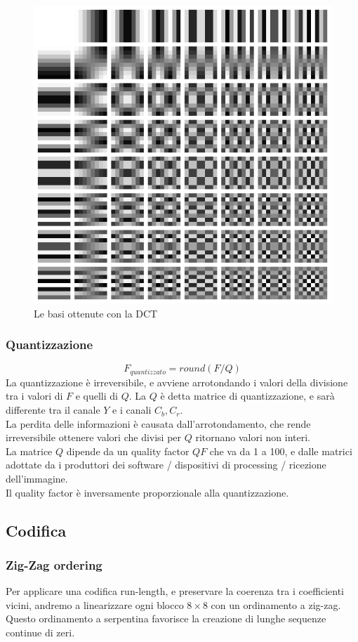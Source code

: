 \documentclass{report}
\begin{document}
	\begin{figure}[htp]
		\centering
		\includegraphics[width=0.5\linewidth]{dct.png}
		\caption{Le basi ottenute con la DCT}
	\end{figure}
	
	\subsubsection{Quantizzazione}
	$$
	F_{quantizzato}= round(F/Q)
	$$
	La quantizzazione è irreversibile, e avviene arrotondando i valori della divisione tra i valori di $F$ e quelli di $Q$. La $Q$ è detta matrice di quantizzazione, e sarà differente tra il canale $Y$ e i canali $C_b,C_r$.\\
	La perdita delle informazioni è causata dall'arrotondamento, che rende irreversibile ottenere valori che divisi per $Q$ ritornano valori non interi.\\
	La matrice $Q$ dipende da un quality factor $QF$ che va da 1 a 100, e dalle matrici adottate da i produttori dei software / dispositivi di processing / ricezione dell'immagine.\\
	Il quality factor è inversamente proporzionale alla quantizzazione.
	
	\subsection{Codifica}
	
	\subsubsection{Zig-Zag ordering}
	Per applicare una codifica run-length, e preservare la coerenza tra i coefficienti vicini, andremo a linearizzare ogni blocco $8\times 8$ con un ordinamento a zig-zag.\\ Questo ordinamento a serpentina favorisce la creazione di lunghe sequenze continue di zeri.
	
\end{document}
